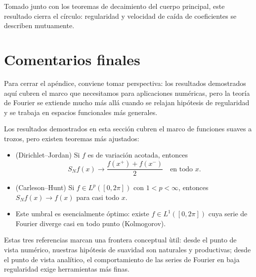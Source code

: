 \documentclass[a4paper,11pt]{report}
\newtheorem{definition}[theorem]{Definición}
\begin{document}
Tomado junto con los teoremas de decaimiento del cuerpo principal, este resultado cierra el c\'irculo: regularidad y velocidad de ca\'ida de coeficientes se describen mutuamente.

\section{Comentarios finales}

Para cerrar el ap\'endice, conviene tomar perspectiva: los resultados demostrados aqu\'i cubren el marco que necesitamos para aplicaciones num\'ericas, pero la teor\'ia de Fourier se extiende mucho m\'as all\'a cuando se relajan hip\'otesis de regularidad y se trabaja en espacios funcionales m\'as generales.

Los resultados demostrados en esta sección cubren el marco de funciones suaves a trozos, pero existen teoremas más ajustados:
\begin{itemize}
\item (Dirichlet--Jordan) Si $f$ es de variación acotada, entonces
\[
S_Nf(x)\to \frac{f(x^+)+f(x^-)}{2}
\quad\text{en todo }x.
\]
\item (Carleson--Hunt) Si $f\in L^p([0,2\pi])$ con $1<p<\infty$, entonces $S_Nf(x)\to f(x)$ para casi todo $x$.
\item Este umbral es esencialmente óptimo: existe $f\in L^1([0,2\pi])$ cuya serie de Fourier diverge casi en todo punto (Kolmogorov).
\end{itemize}

Estas tres referencias marcan una frontera conceptual \`util: desde el punto de vista num\'erico, nuestras hip\'otesis de suavidad son naturales y productivas; desde el punto de vista anal\'itico, el comportamiento de las series de Fourier en baja regularidad exige herramientas m\'as finas.





\end{document}
